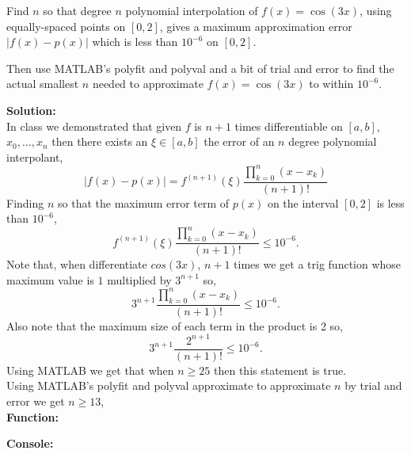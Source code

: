 \documentclass[12pt]{article}
\makeatletter
\theoremstyle{homework}
\newenvironment{exercise}[1]
{\def\@currentlabel{#1}\exercisecore}
{\endexercisecore}
\newcommand{\localhead}[1]{\par\smallskip\noindent\textbf{#1}\nobreak\\}%
\newcommand\solution{\localhead{Solution:}}
\makeatother
\begin{document}
\begin{exercise}{Supplemental 1}
Find $n$ so that degree $n$ polynomial interpolation of 
$f(x)=\cos(3x)$, using equally-spaced points on $[0, 2]$, gives a maximum approximation error $|f(x) - p(x)|$ which is less than $10^{-6}$ on 
$[0, 2]$. 

Then use MATLAB's polyfit and polyval and a bit of trial and error
to find the actual smallest $n$ needed 
to approximate $f(x) = \cos(3x)$ to within $10^{-6}$.\\

\solution In class we demonstrated that given $f$ is $n+1$ times differentiable on $[a,b]$, $x_0,\dots,x_n$ then there exists an $\xi \in [a,b]$ the error of an $n$ degree polynomial interpolant,
\begin{equation*}
  |f(x) - p(x)| = f^{(n+1)}(\xi)\dfrac{\prod_{k = 0}^n (x - x_k)}{(n+1)!}
\end{equation*} 
Finding $n$ so that the maximum error term of $p(x)$ on the interval $[0,2]$ is less than $10^{-6}$,
\begin{equation*}
  f^{(n+1)}(\xi)\dfrac{\prod_{k = 0}^n (x - x_k)}{(n+1)!} \le 10^{-6}.
\end{equation*} 
Note that, when differentiate $cos(3x)$, $n+1$ times we get a trig function whose maximum value is $1$ multiplied by $3^{n+1}$ so,
\begin{equation*}
  3^{n+1}\dfrac{\prod_{k = 0}^n (x - x_k)}{(n+1)!} \le 10^{-6}.
\end{equation*} 
Also note that the maximum size of each term in the product is 2 so,
\begin{equation*}
  3^{n+1}\dfrac{2^{n+1}}{(n+1)!} \le 10^{-6}.
\end{equation*} 
Using MATLAB we get that when $n\geq 25$ then this statement is true. \\

Using MATLAB's polyfit and polyval approximate to approximate $n$ by trial and error we get $n \geq 13$,\\
\textbf{Function:}
\begin{center}

\end{center}

\textbf{Console:}
\begin{center}

\end{center}
\end{exercise}
\vspace{.5in}
\end{document}
